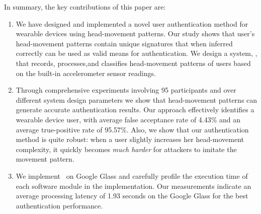 
In summary, the key contributions of this paper are:

\begin{enumerate}

\item We have designed and implemented a novel user authentication method for wearable devices
using head-movement patterns. Our study shows that user's head-movement patterns
contain unique signatures that when inferred correctly can be used as valid
means for authentication. We design a system, \systemname, that records, processes,and classifies
head-movement patterns of users based on the built-in accelerometer sensor readings.


\item %
Through comprehensive experiments
involving 95 participants and over
different system design parameters we show that head-movement patterns
can generate accurate authentication results. Our approach effectively identifies a wearable device user, with average false
acceptance rate of 4.43\% and an average true-positive rate of 95.57\%. Also, we show that our authentication method is quite robust: when a user slightly increases her head-movement complexity, it quickly becomes \emph{much harder} for attackers to imitate the movement pattern.



\item We implement \systemname~on Google Glass and carefully profile the
execution time of each software module in the implementation. Our measurements
indicate an average processing latency of 1.93 seconds on the Google Glass for the best authentication performance.

\end{enumerate}

